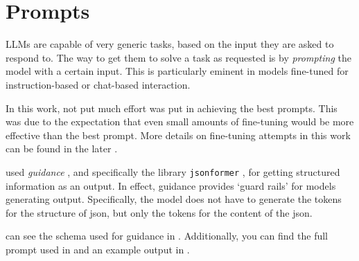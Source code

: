 


\section{Prompts}\label{sec:prompts}
\glspl{LLM} are capable of very generic tasks, based on the input they are asked to respond to.
The way to get them to solve a task as requested is by \textit{prompting} the model with a certain input.
This is particularly eminent in models fine-tuned for instruction-based or chat-based interaction.

In this work, not put much effort was put in achieving the best prompts.
This was due to the expectation that even small amounts of fine-tuning would be more effective than the best prompt.
More details on fine-tuning attempts in this work can be found in the later .

 used \textit{guidance} \cite{guidance_2023}, and specifically the library \texttt{jsonformer} \cite{1rgs_2023}, for getting structured information as an output.
In effect, guidance provides `guard rails' for models generating output.
Specifically, the model does not have to generate the tokens for the structure of json, but only the tokens for the content of the json.


 can see the schema  used for guidance in . Additionally, you can find the full prompt used in  and an example output in .





